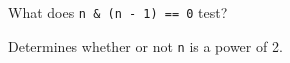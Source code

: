 \question What does \texttt{n & (n - 1) == 0} test?

\begin{solution}[0.25in]
Determines whether or not \texttt{n} is a power of 2.
\end{solution}